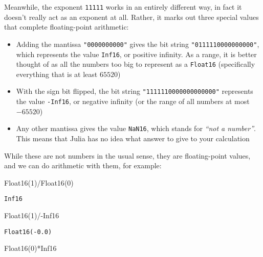 \documentclass[
  letterpaper,
  DIV=11,
  numbers=noendperiod]{scrreprt}
\newenvironment{Shaded}{\begin{snugshade}}{\end{snugshade}}
\newcommand{\ConstantTok}[1]{\textcolor[rgb]{0.56,0.35,0.01}{#1}}
\newcommand{\FloatTok}[1]{\textcolor[rgb]{0.68,0.00,0.00}{#1}}
\newcommand{\FunctionTok}[1]{\textcolor[rgb]{0.28,0.35,0.67}{#1}}
\newcommand{\NormalTok}[1]{\textcolor[rgb]{0.00,0.23,0.31}{#1}}
\newcommand{\OperatorTok}[1]{\textcolor[rgb]{0.37,0.37,0.37}{#1}}
\begin{document}
Meanwhile, the exponent \texttt{11111} works in an entirely different
way, in fact it doesn't really act as an exponent at all. Rather, it
marks out three special values that complete floating-point arithmetic:

\begin{itemize}
\item
  Adding the mantissa \texttt{"0000000000"} gives the bit string
  \texttt{"0111110000000000"}, which represents the value
  \texttt{Inf16}, or positive infinity. As a range, it is better thought
  of as all the numbers too big to represent as a \texttt{Float16}
  (specifically everything that is at least \(65520\))
\item
  With the sign bit flipped, the bit string
  \texttt{"1111110000000000000"} represents the value \texttt{-Inf16},
  or negative infinity (or the range of all numbers at most \(-65520\))
\item
  Any other mantissa gives the value \texttt{NaN16}, which stands for
  \emph{``not a number''}. This means that Julia has no idea what answer
  to give to your calculation
\end{itemize}

While these are not numbers in the usual sense, they are floating-point
values, and we can do arithmetic with them, for example:

\begin{Shaded}
\begin{Highlighting}[]
\FunctionTok{Float16}\NormalTok{(}\FloatTok{1}\NormalTok{)}\OperatorTok{/}\FunctionTok{Float16}\NormalTok{(}\FloatTok{0}\NormalTok{)}
\end{Highlighting}
\end{Shaded}

\begin{verbatim}
Inf16
\end{verbatim}

\begin{Shaded}
\begin{Highlighting}[]
\FunctionTok{Float16}\NormalTok{(}\FloatTok{1}\NormalTok{)}\OperatorTok{/{-}}\ConstantTok{Inf16}
\end{Highlighting}
\end{Shaded}

\begin{verbatim}
Float16(-0.0)
\end{verbatim}

\begin{Shaded}
\begin{Highlighting}[]
\FunctionTok{Float16}\NormalTok{(}\FloatTok{0}\NormalTok{)}\OperatorTok{*}\ConstantTok{Inf16}
\end{Highlighting}
\end{Shaded}
\end{document}
